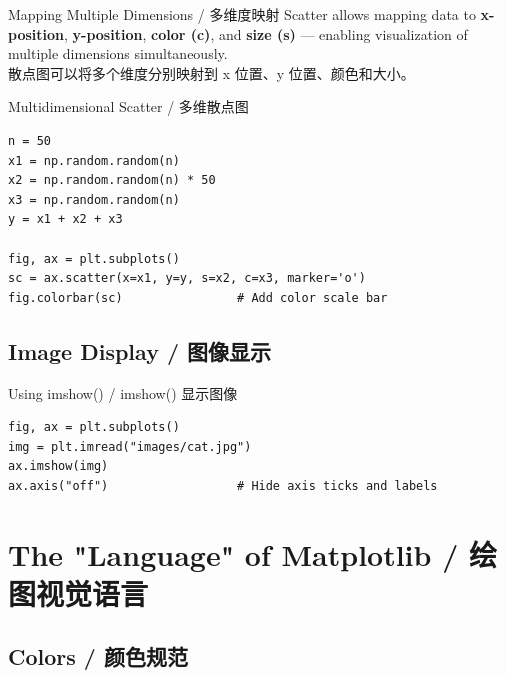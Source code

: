 \documentclass[11pt,a4paper]{article}
\begin{document}
\begin{concept}{Mapping Multiple Dimensions / 多维度映射}
    Scatter allows mapping data to \textbf{x-position}, \textbf{y-position}, \textbf{color (c)}, and \textbf{size (s)} — enabling visualization of multiple dimensions simultaneously. \\
    散点图可以将多个维度分别映射到 x 位置、y 位置、颜色和大小。
\end{concept}

\begin{examplebox}{Multidimensional Scatter / 多维散点图}
\begin{lstlisting}
n = 50
x1 = np.random.random(n)
x2 = np.random.random(n) * 50
x3 = np.random.random(n)
y = x1 + x2 + x3

fig, ax = plt.subplots()
sc = ax.scatter(x=x1, y=y, s=x2, c=x3, marker='o')
fig.colorbar(sc)                # Add color scale bar
\end{lstlisting}
\end{examplebox}

\subsection{Image Display / 图像显示}

\begin{examplebox}{Using imshow() / imshow() 显示图像}
\begin{lstlisting}
fig, ax = plt.subplots()
img = plt.imread("images/cat.jpg")
ax.imshow(img)
ax.axis("off")                  # Hide axis ticks and labels
\end{lstlisting}
\end{examplebox}

\section{The "Language" of Matplotlib / 绘图视觉语言}

\subsection{Colors / 颜色规范}
\end{document}
